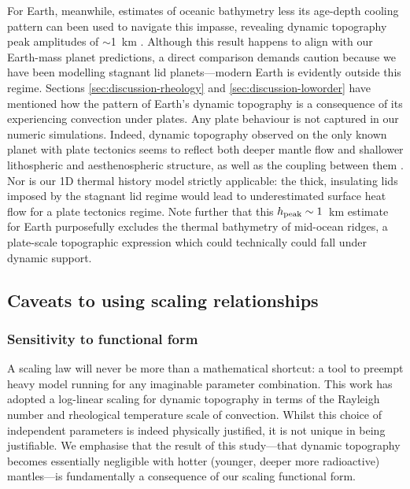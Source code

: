 \documentclass[trackchanges]{aastex63}
\begin{document}
For Earth, meanwhile, estimates of oceanic bathymetry less its age-depth cooling pattern can been used to navigate this impasse, revealing dynamic topography peak amplitudes of $\sim$1~km \citep{hoggard_global_2016, hoggard_oceanic_2017}. Although this result happens to align with our Earth-mass planet predictions, a direct comparison demands caution because we have been modelling stagnant lid planets---modern Earth is evidently outside this regime. Sections \ref{sec:discussion-rheology} and \ref{sec:discussion-loworder} have mentioned how the pattern of Earth's dynamic topography is a consequence of its experiencing convection under plates. Any plate behaviour is not captured in our numeric simulations. Indeed, dynamic topography observed on the only known planet with plate tectonics seems to reflect both deeper mantle flow and shallower lithospheric and aesthenospheric structure, as well as the coupling between them \citep{davies_earths_2019}. Nor is our 1D thermal history model strictly applicable: the thick, insulating lids imposed by the stagnant lid regime would lead to underestimated surface heat flow for a plate tectonics regime. Note further that this $h_{\rm peak}\sim1$~km estimate for Earth purposefully excludes the thermal bathymetry of mid-ocean ridges, a plate-scale topographic expression which could technically could fall under dynamic support.



\subsection{Caveats to using scaling relationships}


\subsubsection{Sensitivity to functional form}

A scaling law will never be more than a mathematical shortcut: a tool to preempt heavy model running for any imaginable parameter combination. This work has adopted a log-linear scaling for dynamic topography in terms of the Rayleigh number and rheological temperature scale of convection. Whilst this choice of independent parameters is indeed physically justified, it is not unique in being justifiable. %
We emphasise that the result of this study---that dynamic topography becomes essentially negligible with hotter (younger, deeper more radioactive) mantles---is fundamentally a consequence of our scaling functional form.
\end{document}
